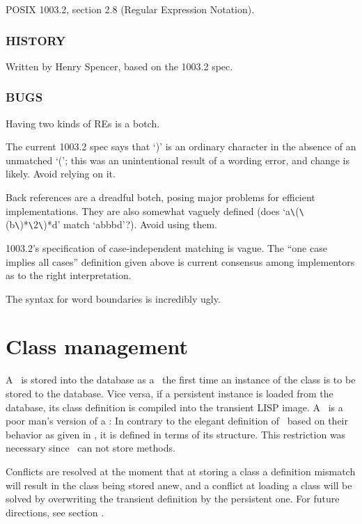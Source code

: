 
POSIX 1003.2, section 2.8 (Regular Expression Notation).  

\subsubsection{HISTORY}

Written by Henry Spencer, based on the 1003.2 spec.  

\subsubsection{BUGS}

Having two kinds of REs is a botch.

The current 1003.2 spec says that `)' is an ordinary character in the
absence of an unmatched `('; this was an unintentional result of a
wording error, and change is likely. Avoid relying on it.

Back references are a dreadful botch, posing major problems for
efficient implementations. They are also somewhat vaguely defined
(does `a\verb|\|(\verb|\|(b\verb|\|)*\verb|\|2\verb|\|)*d' match
`abbbd'?). Avoid using them.

1003.2's specification of case-independent matching is vague. The
``one case implies all cases'' definition given above is current
consensus among implementors as to the right interpretation.

The syntax for word boundaries is incredibly ugly. 

\section{Class management}

A \clsmo\ is stored into the database as a \clsdo\ the first time an
instance of the class is to be stored to the database. Vice versa, if
a persistent instance is loaded from the database, its class
definition is compiled into the transient LISP image.  A \clsdo\ is a
poor man's version of a \clsmo: In contrary to the elegant definition
of \mo[s]\ based on their behavior as given in \cite{bib:AMOP}, it is
defined in terms of its structure.  This restriction was necessary
since \plob\ can not store methods.

Conflicts are resolved at the moment that at storing a class a
definition mismatch will result in the class being stored anew, and a
conflict at loading a class will be solved by overwriting the
transient definition by the persistent one. For future directions, see
section .

